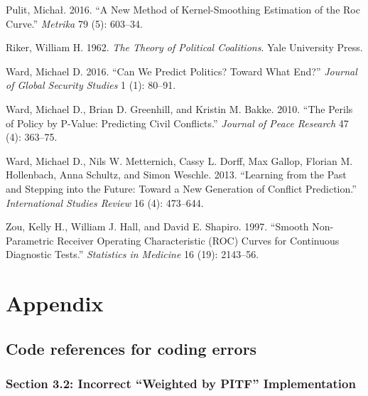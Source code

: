\documentclass[
]{article}
\newlength{\cslhangindent}
\newenvironment{cslreferences}%
  {\setlength{\parindent}{0pt}%
  \everypar{\setlength{\hangindent}{\cslhangindent}}\ignorespaces}%
  {\par}
\begin{document}
\begin{cslreferences}
\leavevmode\hypertarget{ref-pulit:2016}{}%
Pulit, Michał. 2016. ``A New Method of Kernel-Smoothing Estimation of the Roc Curve.'' \emph{Metrika} 79 (5): 603--34.

\leavevmode\hypertarget{ref-riker:1962}{}%
Riker, William H. 1962. \emph{The Theory of Political Coalitions}. Yale University Press.

\leavevmode\hypertarget{ref-ward:2016}{}%
Ward, Michael D. 2016. ``Can We Predict Politics? Toward What End?'' \emph{Journal of Global Security Studies} 1 (1): 80--91.

\leavevmode\hypertarget{ref-ward:etal:2010}{}%
Ward, Michael D., Brian D. Greenhill, and Kristin M. Bakke. 2010. ``The Perils of Policy by P-Value: Predicting Civil Conflicts.'' \emph{Journal of Peace Research} 47 (4): 363--75.

\leavevmode\hypertarget{ref-ward:etal:2013}{}%
Ward, Michael D., Nils W. Metternich, Cassy L. Dorff, Max Gallop, Florian M. Hollenbach, Anna Schultz, and Simon Weschle. 2013. ``Learning from the Past and Stepping into the Future: Toward a New Generation of Conflict Prediction.'' \emph{International Studies Review} 16 (4): 473--644.

\leavevmode\hypertarget{ref-zou:etal:1997}{}%
Zou, Kelly H., William J. Hall, and David E. Shapiro. 1997. ``Smooth Non-Parametric Receiver Operating Characteristic (ROC) Curves for Continuous Diagnostic Tests.'' \emph{Statistics in Medicine} 16 (19): 2143--56.
\end{cslreferences}

\newpage

\hypertarget{appendix-appendix}{%
\appendix}


\hypertarget{appendix}{%
\section{Appendix}\label{appendix}}

\renewcommand{\thefigure}{A\arabic{figure}}
\setcounter{figure}{0}

\renewcommand{\thetable}{A\arabic{table}} 
\setcounter{table}{0}

\hypertarget{code-references-for-coding-errors}{%
\subsection{Code references for coding errors}\label{code-references-for-coding-errors}}

\hypertarget{section-3.2-incorrect-weighted-by-pitf-implementation}{%
\subsubsection{Section 3.2: Incorrect ``Weighted by PITF'' Implementation}\label{section-3.2-incorrect-weighted-by-pitf-implementation}}
\end{document}
